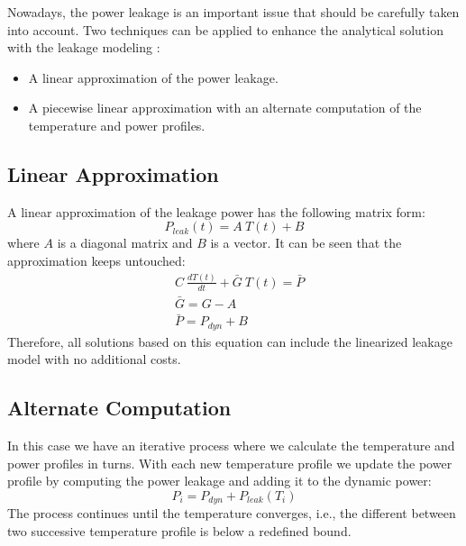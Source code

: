   Nowadays, the power leakage is an important issue that should be carefully taken into account. Two techniques can be applied to enhance the analytical solution with the leakage modeling \cite{liu2007}:
  \begin{itemize}
    \item A linear approximation of the power leakage.
    \item A piecewise linear approximation with an alternate computation of the temperature and power profiles.
  \end{itemize}

\subsection{Linear Approximation}
A linear approximation of the leakage power has the following matrix form:
\[
  P_{leak}(t) = A \: T(t) + B
\]
where $A$ is a diagonal matrix and $B$ is a vector. It can be seen that the approximation keeps  untouched:
\begin{align*}
  & C \: \frac{dT(t)}{dt} + \bar{G} \: T(t) = \bar{P} \\
  & \bar{G} = G - A \\
  & \bar{P} = P_{dyn} + B
\end{align*}
Therefore, all solutions based on this equation can include the linearized leakage model with no additional costs.

\subsection{Alternate Computation}
In this case we have an iterative process where we calculate the temperature and power profiles in turns. With each new temperature profile we update the power profile by computing the power leakage and adding it to the dynamic power:
\[
  P_i = P_{dyn} + P_{leak}(T_i)
\]
The process continues until the temperature converges, i.e., the different between two successive temperature profile is below a redefined bound.
